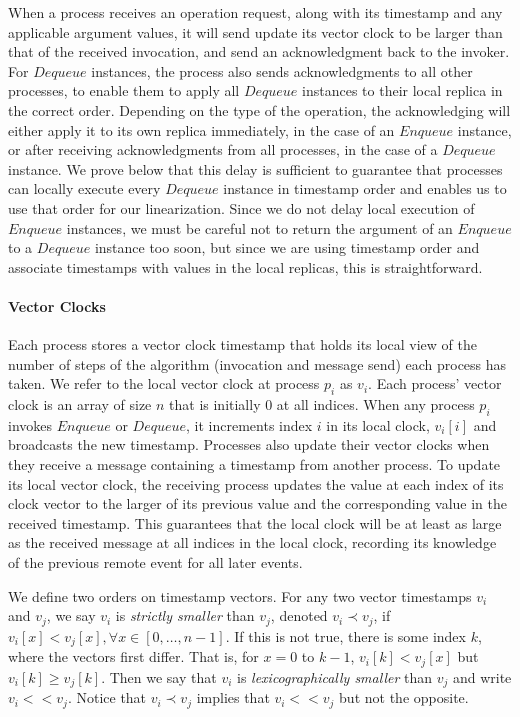 \documentclass[a4paper,anonymous,USenglish]{lipics-v2021}
\theoremstyle{definition}
\begin{document}
When a process receives an operation request, along with its timestamp and any applicable argument values, it will send update its vector clock to be larger than that of the received invocation, and send an acknowledgment back to the invoker.  For $Dequeue$ instances, the process also sends acknowledgments to all other processes, to enable them to apply all $Dequeue$ instances to their local replica in the correct order.  Depending on the type of the operation, the acknowledging will either apply it to its own replica immediately, in the case of an $Enqueue$ instance, or after receiving acknowledgments from all processes, in the case of a $Dequeue$ instance.  We prove below that this delay is sufficient to guarantee that processes can locally execute every $Dequeue$ instance in timestamp order and enables us to use that order for our linearization.  Since we do not delay local execution of $Enqueue$ instances, we must be careful not to return the argument of an $Enqueue$ to a $Dequeue$ instance too soon, but since we are using timestamp order and associate timestamps with values in the local replicas, this is straightforward.

\paragraph{Vector Clocks}  Each process stores a vector clock timestamp that holds its local view of the number of steps of the algorithm (invocation and message send) each process has taken.  We refer to the local vector clock at process $p_i$ as $v_i$.  Each process' vector clock is an array of size $n$ that is initially 0 at all indices.  When any process $p_i$ invokes $Enqueue$ or $Dequeue$, it increments index $i$ in its local clock, $v_i[i]$ and broadcasts the new timestamp.  Processes also update their vector clocks when they receive a message containing a timestamp from another process.  To update its local vector clock, the receiving process updates the value at each index of its clock vector to the larger of its previous value and the corresponding value in the received timestamp.  This guarantees that the local clock will be at least as large as the received message at all indices in the local clock, recording its knowledge of the previous remote event for all later events.

We define two orders on timestamp vectors.  For any two vector timestamps $v_i$ and $v_j$, we say $v_i$ is \emph{strictly smaller} than $v_j$, denoted $v_i \prec  v_j$, if $v_i[x] < v_j[x],\forall x \in [0, \dots, n-1]$.  If this is not true, there is some index $k$, where the vectors first differ.  That is, for $x = 0$ to $k-1$, $v_i[k] < v_j[x]$ but $v_i[k] \geq v_j [k]$.  Then we say that $v_i$ is \emph{lexicographically smaller} than $v_j$ and write $v_i << v_j$.  Notice that $v_i \prec v_j$ implies that $v_i << v_j$ but not the opposite.
\end{document}
